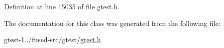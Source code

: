 \-Definition at line 15035 of file gtest.\-h.



\-The documentation for this class was generated from the following file\-:\begin{DoxyCompactItemize}
\item 
gtest-\/1../fused-\/src/gtest/\hyperlink{fused-src_2gtest_2gtest_8h}{gtest.\-h}\end{DoxyCompactItemize}
